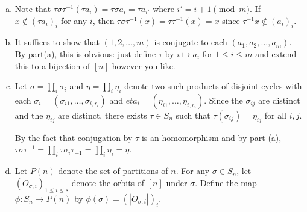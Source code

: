 \documentclass{article}
\begin{document}
\vspace{-1em}
\begin{enumerate}[a.] 
\item Note that $\tau\sigma \tau^{-1} (\tau a_i) = \tau \sigma a_i = \tau a_{i'}$ where $i' = i + 1 \pmod m$.  If $x \not\in (\tau a_i)_i$ for any $i$, then $\tau\sigma \tau^{-1}(x) = \tau\tau^{-1}(x) = x$ since $\tau^{-1} x \not\in (a_i)_i$.
\begin{comment}
Since every permutation is a product of transpositions, WLOG $\tau$ is a transposition. By looking at $S_{n+1}$, WLOG $n > m$ (if the identity is true for $m<n$ in $S_{n+1}$, then it must be true for $m \le n$ in $S_n$). If $\tau$ and $\sigma$ have disjoint support, we're done.  If $\tau$ transposes two of the $a_i$, note that, since $m<n$, $\tau$ can be decomposed into three transpositions each of which transposes an $a_i$ with a non-$a_i$ (consider the equality $(1, 2) = (2, 3) (1, 3) (2, 3)$ and generalize).  Thus, WLOG $\tau$ transposes an $a_i$ with a non-$a_i$.  By cyclically rearranging the $a_i$, WLOG $\tau$ transposes $a_1$ with $\tau(a_1) \not\in (a_i)_i$. To finish, consider $(1,4) (1,2,3) (1,4) = (4, 2, 3)$ and generalize.
\end{comment}

\item It suffices to show that  $(1, 2, \ldots, m)$ is conjugate to each $(a_1, a_2, \ldots, a_m)$.  By part(a), this is obvious: just define $\tau$ by $i \mapsto a_i$ for $1 \le i \le m$ and extend this to a bijection of $[n]$ however you like.

\item Let $\sigma = \prod_i \sigma_i$ and $\eta = \prod_i \eta_i$ denote two such products of disjoint cycles with each $\sigma_i = (\sigma_{i1}, \ldots, \sigma_{i,r_i})$ and $eta_i = (\eta_{i1}, \ldots, \eta_{i, r_i})$. Since the $\sigma_{ij}$ are distinct and the $\eta_{ij}$ are distinct, there exists $\tau \in S_n$ such that $\tau(\sigma_{ij}) = \eta_{ij}$ for all $i,j$.

By the fact that conjugation by $\tau$ is an homomorphism and by part (a),
$\tau \sigma \tau^{-1} = \prod_i \tau\sigma_i \tau_{-1} = \prod_i \eta_i = \eta$.

\item Let $P(n)$ denote the set of partitions of $n$.  For any $\sigma \in S_n$, let $(O_{\sigma, i})_{1\le i \le s}$ denote the orbits of $[n]$ under  $\sigma$.  Define the map $\phi:S_n \to P(n)$ by $\phi(\sigma) = (|O_{\sigma, i}|)_i$.


\end{enumerate}
\end{document}
